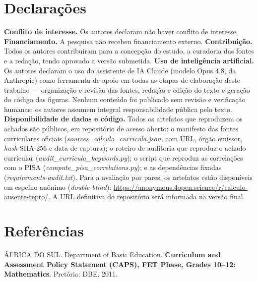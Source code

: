 \documentclass[12pt,a4paper,oneside]{article}
\begin{document}
\section*{Declarações}
\noindent\textbf{Conflito de interesse.} Os autores declaram não haver
conflito de interesse. \textbf{Financiamento.} A pesquisa não recebeu
financiamento externo. \textbf{Contribuição.} Todos os autores
contribuíram para a concepção do estudo, a curadoria das fontes e a
redação, tendo aprovado a versão submetida. \textbf{Uso de inteligência
artificial.} Os autores declaram o uso do assistente de IA Claude
(modelo Opus 4.8, da Anthropic) como ferramenta de apoio em todas as
etapas de elaboração deste trabalho --- organização e revisão das fontes,
redação e edição do texto e geração do código das figuras. Nenhum
conteúdo foi publicado sem revisão e verificação humanas; os autores
assumem integral responsabilidade pública pelo texto.
\textbf{Disponibilidade de dados e código.} Todos os artefatos que
reproduzem os achados são públicos, em repositório de acesso aberto: o
manifesto das fontes curriculares oficiais (\emph{sources\_calculo\_curricula.json},
com URL, órgão emissor, \emph{hash} SHA-256 e data de captura); o roteiro
de auditoria que reproduz o achado curricular (\emph{audit\_curricula\_keywords.py});
o script que reproduz as correlações com o PISA
(\emph{compute\_pisa\_correlations.py}); e as dependências fixadas
(\emph{requirements-audit.txt}). Para a avaliação por pares, os artefatos
estão disponíveis em espelho anônimo (\emph{double-blind}):
\url{https://anonymous.4open.science/r/calculo-ausente-repro/}. A URL
definitiva do repositório será informada na versão final.

\newpage
\section*{Referências}

\begingroup
\small
{}
\setlength{\parindent}{0pt}
\raggedright
\newcommand{\refitem}[1]{\par #1\par\vspace{1pt}}

\refitem{ÁFRICA DO SUL. Department of Basic Education. \textbf{Curriculum
and Assessment Policy Statement (CAPS), FET Phase, Grades 10--12:
Mathematics}. Pretória: DBE, 2011.}
\end{document}
